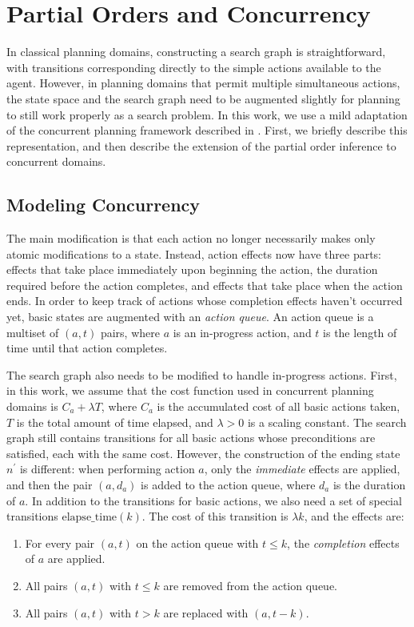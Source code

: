 \documentclass[letterpaper]{article}
\theoremstyle{plain} \newtheorem{theorem}{Theorem} \newtheorem{proposition}{Proposition} \newtheorem{lemma}{Lemma}
\theoremstyle{definition} \newtheorem{definition}{Definition} \newtheorem{conjecture}{Conjecture} \newtheorem*{example}{Example}
\theoremstyle{remark} \newtheorem*{remark}{Remark} \newtheorem*{note}{Note} \newtheorem{case}{Case}
\begin{document}
\section{Partial Orders and Concurrency} 

In classical planning domains, constructing a search graph is
straightforward, with transitions corresponding directly to the
simple actions available to the agent. However, in planning domains
that permit multiple simultaneous actions, the state space and the
search graph need to be augmented slightly for planning to still
work properly as a search problem. In this work, we use a mild
adaptation of the concurrent planning framework described in
\citet{bacchus2001planning}.
First, we briefly describe this representation, and then describe
the extension of the partial order inference to concurrent domains.

\subsection{Modeling Concurrency}

The main modification is that each action no longer necessarily
makes only atomic modifications to a state. Instead, action effects
now have three parts: effects that take place immediately upon
beginning the action, the duration required before the action
completes, and effects that take place when the action ends. In
order to keep track of actions whose completion effects haven't
occurred yet, basic states are augmented with an \emph{action queue}.
An action queue is a multiset of $(a, t)$ pairs, where $a$ is an
in-progress action, and $t$ is the length of time until that action
completes.

The search graph also needs to be modified to handle in-progress actions. First, 
in this work, we assume that the cost function used in concurrent planning domains is
$C_a + \lambda T$, where $C_a$ is the accumulated cost of all basic actions taken, $T$ is
the total amount of time elapsed, and $\lambda > 0$ is a scaling constant. The search graph still contains transitions for all
basic actions whose preconditions are satisfied, each with the same cost. However, the
construction of the ending state $n^\prime$ is different: when performing action $a$, only the
\emph{immediate} effects are applied, and then the pair $(a, d_a)$ is added to the action
queue, where $d_a$ is the duration of $a$. 
In addition to the transitions for basic actions, we also need a set of special transitions
$\mathrm{elapse\_time}(k)$. The cost of this transition is $\lambda k$, and the effects are: 
\begin{enumerate}
	\item For every pair $(a, t)$ on the action queue with $t \le k$, the \emph{completion} effects of $a$ are applied.
	\item All pairs $(a, t)$ with $t \le k$ are removed from the action queue.
	\item All pairs $(a, t)$ with $t > k$ are replaced with $(a, t-k)$.
\end{enumerate}
\end{document}
